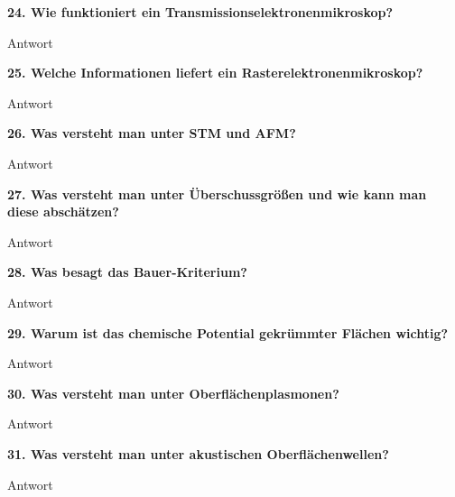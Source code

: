 \noindent\textbf{24. Wie funktioniert ein Transmissionselektronenmikroskop?}\\
\begin{addmargin}[25pt]{0pt}
Antwort\\
\end{addmargin}

\noindent\textbf{25. Welche Informationen liefert ein Rasterelektronenmikroskop?}\\
\begin{addmargin}[25pt]{0pt}
Antwort\\
\end{addmargin}

\noindent\textbf{26. Was versteht man unter STM und AFM?}\\
\begin{addmargin}[25pt]{0pt}
Antwort\\
\end{addmargin}

\noindent\textbf{27. Was versteht man unter Überschussgrößen und wie kann man diese abschätzen?}\\
\begin{addmargin}[25pt]{0pt}
Antwort\\
\end{addmargin}

\noindent\textbf{28. Was besagt das Bauer-Kriterium?}\\
\begin{addmargin}[25pt]{0pt}
Antwort\\
\end{addmargin}

\noindent\textbf{29. Warum ist das chemische Potential gekrümmter Flächen wichtig?}\\
\begin{addmargin}[25pt]{0pt}
Antwort\\
\end{addmargin}

\noindent\textbf{30. Was versteht man unter Oberflächenplasmonen?}\\
\begin{addmargin}[25pt]{0pt}
Antwort\\
\end{addmargin}

\noindent\textbf{31. Was versteht man unter akustischen Oberflächenwellen?}\\
\begin{addmargin}[25pt]{0pt}
Antwort\\
\end{addmargin}


